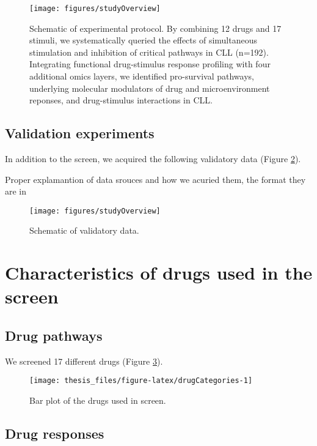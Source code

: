 \documentclass[11pt, a4paper, twosided]{book}
\begin{document}
\begin{figure}

{\centering \texttt{[image: figures/studyOverview]} 

}

\caption{Schematic of experimental protocol. By combining 12 drugs and 17 stimuli, we systematically queried the effects of simultaneous stimulation and inhibition of critical pathways in CLL (n=192). Integrating functional drug-stimulus response profiling with four additional omics layers, we identified pro-survival pathways, underlying molecular modulators of drug and microenvironment reponses, and drug-stimulus interactions in CLL.}\label{fig:studyOverview}
\end{figure}
\hypertarget{validation-experiments}{%
\subsection{Validation experiments}\label{validation-experiments}}

In addition to the screen, we acquired the following validatory data (Figure \ref{fig:additionalData}).

Proper explamantion of data srouces and how we acuried them, the format they are in


\begin{figure}

{\centering \texttt{[image: figures/studyOverview]} 

}

\caption{Schematic of validatory data.}\label{fig:additionalData}
\end{figure}
\hypertarget{characteristics-of-drugs-used-in-the-screen}{%
\section{Characteristics of drugs used in the screen}\label{characteristics-of-drugs-used-in-the-screen}}

\hypertarget{drug-pathways}{%
\subsection{Drug pathways}\label{drug-pathways}}

We screened 17 different drugs (Figure \ref{fig:drugCategories}).


\begin{figure}

{\centering \texttt{[image: thesis\_files/figure-latex/drugCategories-1]} 

}

\caption{Bar plot of the drugs used in screen.}\label{fig:drugCategories}
\end{figure}
\hypertarget{drug-responses}{%
\subsection{Drug responses}\label{drug-responses}}
\end{document}
